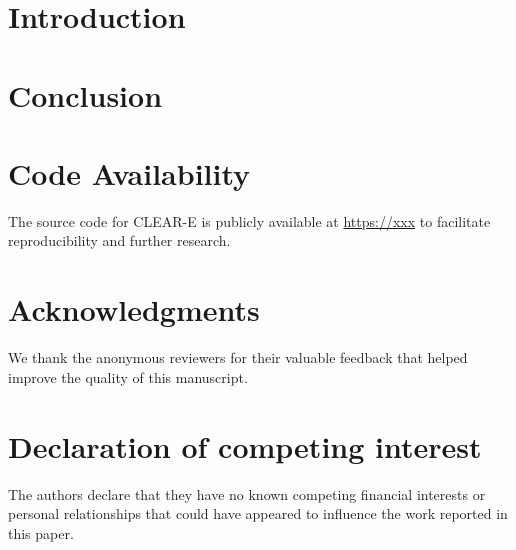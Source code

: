 \documentclass[final,3p,times,review,sort&compress]{elsarticle}
\begin{document}
\begin{frontmatter}

\title{}


\author[aa]{author 1}

\author[bb]{author 2}





\address[aa]{address 1}

\address[bb]{address 2}




\begin{abstract}

\end{abstract}

\begin{keyword}

\end{keyword}

\end{frontmatter}

\linenumbers
\section{Introduction}



\section{Conclusion}
\label{sec:conclusion}


\section*{Code Availability}
The source code for CLEAR-E is publicly available at \url{https://xxx} to facilitate reproducibility and further research.


\section*{Acknowledgments}
We thank the anonymous reviewers for their valuable feedback that helped improve the quality of this manuscript.

\section*{Declaration of competing interest}
The authors declare that they have no known competing financial interests or personal relationships that could have appeared to influence the work reported in this paper.
\end{document}
